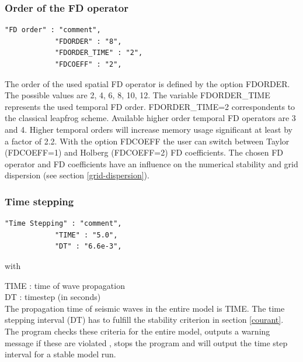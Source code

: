 \documentclass[11pt,onecolumn,oneside]{article}
\begin{document}
\subsubsection{Order of the FD operator}

\begin{verbatim}
"FD order" : "comment",
            "FDORDER" : "8",
            "FDORDER_TIME" : "2",
            "FDCOEFF" : "2",
\end{verbatim}

The order of the used spatial FD operator is defined by the option FDORDER. The possible values are 2, 4, 6, 8, 10, 12. 
The variable FDORDER\_TIME represents the used temporal FD order. FDORDER\_TIME=2 correspondents to the classical leapfrog scheme. Available higher order temporal FD operators are 3 and 4. Higher temporal orders will increase memory usage significant at least by a factor of 2.2. With the option FDCOEFF the user can switch between Taylor (FDCOEFF=1) and Holberg (FDCOEFF=2) FD coefficients. The chosen FD operator and FD coefficients have an influence on the numerical stability and grid dispersion (see section \ref{grid-dispersion}).


\subsubsection{Time stepping}
\begin{verbatim}
"Time Stepping" : "comment",
            "TIME" : "5.0",
            "DT" : "6.6e-3",
\end{verbatim}

with

TIME : time of wave propagation\\
DT : timestep (in seconds)\\


The propagation time of seismic waves in the entire model is TIME. The time stepping interval (DT) has to fulfill the stability criterion  in section \ref{courant}. 
The program checks these criteria for the entire model, outputs a warning message if these are violated , stops the program and will output the time step interval for a stable model run. 
\end{document}
